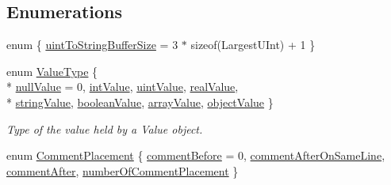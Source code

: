\subsection*{Enumerations}
\begin{DoxyCompactItemize}
\item 
enum \{ \hyperlink{namespace_json_a0c5f614b019f20b4598dcaec09d9e820ae4f2008c7919f20d81286121d1374424}{uint\+To\+String\+Buffer\+Size} = 3 $\ast$ sizeof(Largest\+U\+Int) + 1
 \}
\item 
enum \hyperlink{namespace_json_a7d654b75c16a57007925868e38212b4e}{Value\+Type} \{ \\*
\hyperlink{namespace_json_a7d654b75c16a57007925868e38212b4ea7d9899633b4409bd3fc107e6737f8391}{null\+Value} = 0, 
\hyperlink{namespace_json_a7d654b75c16a57007925868e38212b4eae5a9d708d5c9e23ae9bf98898522512d}{int\+Value}, 
\hyperlink{namespace_json_a7d654b75c16a57007925868e38212b4eaea788d9a3bb00adc6d68d97d43e1ccd3}{uint\+Value}, 
\hyperlink{namespace_json_a7d654b75c16a57007925868e38212b4eab837c7b869c14d8be712deb45c9e490e}{real\+Value}, 
\\*
\hyperlink{namespace_json_a7d654b75c16a57007925868e38212b4ea804ef857affea2d415843c73f261c258}{string\+Value}, 
\hyperlink{namespace_json_a7d654b75c16a57007925868e38212b4ea14c30dbf4da86f7b809be299f671f7fd}{boolean\+Value}, 
\hyperlink{namespace_json_a7d654b75c16a57007925868e38212b4eadc8f264f36b55b063c78126b335415f4}{array\+Value}, 
\hyperlink{namespace_json_a7d654b75c16a57007925868e38212b4eae8386dcfc36d1ae897745f7b4f77a1f6}{object\+Value}
 \}\begin{DoxyCompactList}\small\item\em Type of the value held by a Value object. \end{DoxyCompactList}
\item 
enum \hyperlink{namespace_json_a4fc417c23905b2ae9e2c47d197a45351}{Comment\+Placement} \{ \hyperlink{namespace_json_a4fc417c23905b2ae9e2c47d197a45351a52f1733775460517b2ea6bedf4906d52}{comment\+Before} = 0, 
\hyperlink{namespace_json_a4fc417c23905b2ae9e2c47d197a45351a008a230a0586de54f30b76afe70fdcfa}{comment\+After\+On\+Same\+Line}, 
\hyperlink{namespace_json_a4fc417c23905b2ae9e2c47d197a45351ac5784ca53b12250888ddb642b06aebef}{comment\+After}, 
\hyperlink{namespace_json_a4fc417c23905b2ae9e2c47d197a45351abcbd3eb00417335e094e4a03379659b5}{number\+Of\+Comment\+Placement}
 \}
\end{DoxyCompactItemize}
